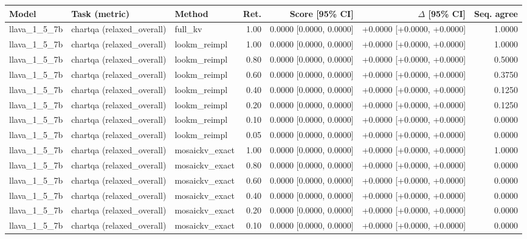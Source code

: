 \begin{longtable}{lllrrrr}
Model & Task (metric) & Method & Ret. & Score [95\% CI] & $\Delta$ [95\% CI] & Seq. agree \\
\hline
llava\_1\_5\_7b & chartqa (relaxed\_overall) & full\_kv & 1.00 & 0.0000 [0.0000, 0.0000] & +0.0000 [+0.0000, +0.0000] & 1.0000 \\
llava\_1\_5\_7b & chartqa (relaxed\_overall) & lookm\_reimpl & 1.00 & 0.0000 [0.0000, 0.0000] & +0.0000 [+0.0000, +0.0000] & 1.0000 \\
llava\_1\_5\_7b & chartqa (relaxed\_overall) & lookm\_reimpl & 0.80 & 0.0000 [0.0000, 0.0000] & +0.0000 [+0.0000, +0.0000] & 0.5000 \\
llava\_1\_5\_7b & chartqa (relaxed\_overall) & lookm\_reimpl & 0.60 & 0.0000 [0.0000, 0.0000] & +0.0000 [+0.0000, +0.0000] & 0.3750 \\
llava\_1\_5\_7b & chartqa (relaxed\_overall) & lookm\_reimpl & 0.40 & 0.0000 [0.0000, 0.0000] & +0.0000 [+0.0000, +0.0000] & 0.1250 \\
llava\_1\_5\_7b & chartqa (relaxed\_overall) & lookm\_reimpl & 0.20 & 0.0000 [0.0000, 0.0000] & +0.0000 [+0.0000, +0.0000] & 0.1250 \\
llava\_1\_5\_7b & chartqa (relaxed\_overall) & lookm\_reimpl & 0.10 & 0.0000 [0.0000, 0.0000] & +0.0000 [+0.0000, +0.0000] & 0.0000 \\
llava\_1\_5\_7b & chartqa (relaxed\_overall) & lookm\_reimpl & 0.05 & 0.0000 [0.0000, 0.0000] & +0.0000 [+0.0000, +0.0000] & 0.0000 \\
llava\_1\_5\_7b & chartqa (relaxed\_overall) & mosaickv\_exact & 1.00 & 0.0000 [0.0000, 0.0000] & +0.0000 [+0.0000, +0.0000] & 1.0000 \\
llava\_1\_5\_7b & chartqa (relaxed\_overall) & mosaickv\_exact & 0.80 & 0.0000 [0.0000, 0.0000] & +0.0000 [+0.0000, +0.0000] & 0.0000 \\
llava\_1\_5\_7b & chartqa (relaxed\_overall) & mosaickv\_exact & 0.60 & 0.0000 [0.0000, 0.0000] & +0.0000 [+0.0000, +0.0000] & 0.0000 \\
llava\_1\_5\_7b & chartqa (relaxed\_overall) & mosaickv\_exact & 0.40 & 0.0000 [0.0000, 0.0000] & +0.0000 [+0.0000, +0.0000] & 0.0000 \\
llava\_1\_5\_7b & chartqa (relaxed\_overall) & mosaickv\_exact & 0.20 & 0.0000 [0.0000, 0.0000] & +0.0000 [+0.0000, +0.0000] & 0.0000 \\
llava\_1\_5\_7b & chartqa (relaxed\_overall) & mosaickv\_exact & 0.10 & 0.0000 [0.0000, 0.0000] & +0.0000 [+0.0000, +0.0000] & 0.0000 \\

\end{longtable}
